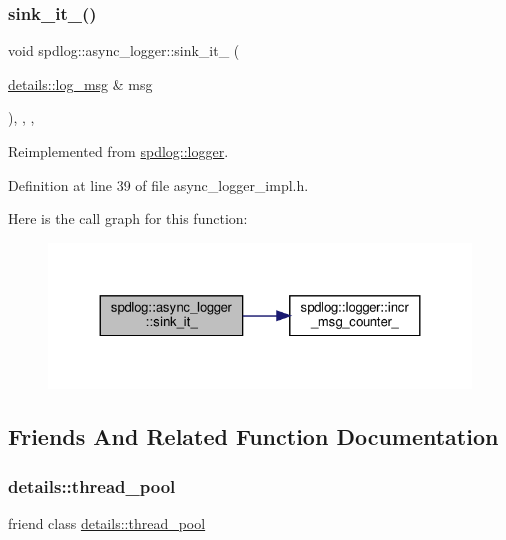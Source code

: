 \subsubsection{\texorpdfstring{sink\+\_\+it\+\_\+()}{sink\_it\_()}}
{\footnotesize\ttfamily void spdlog\+::async\+\_\+logger\+::sink\+\_\+it\+\_\+ (\begin{DoxyParamCaption}\item[{\hyperlink{structspdlog_1_1details_1_1log__msg}{details\+::log\+\_\+msg} \&}]{msg }\end{DoxyParamCaption})\hspace{0.3cm}{\ttfamily [inline]}, {\ttfamily [override]}, {\ttfamily [protected]}, {\ttfamily [virtual]}}



Reimplemented from \hyperlink{classspdlog_1_1logger_a43ac8d73671a109cba253eadb0b049e2}{spdlog\+::logger}.



Definition at line 39 of file async\+\_\+logger\+\_\+impl.\+h.

Here is the call graph for this function\+:
\nopagebreak
\begin{figure}[H]
\begin{center}
\leavevmode
\includegraphics[width=324pt]{classspdlog_1_1async__logger_aefd367c3266773bfe756d34150705329_cgraph}
\end{center}
\end{figure}


\subsection{Friends And Related Function Documentation}
\mbox{\label{classspdlog_1_1async__logger_a67ce2a7de422d11203d66f1f6da4be03}} 
\subsubsection{\texorpdfstring{details\+::thread\+\_\+pool}{details::thread\_pool}}
{\footnotesize\ttfamily friend class \hyperlink{classspdlog_1_1details_1_1thread__pool}{details\+::thread\+\_\+pool}\hspace{0.3cm}{\ttfamily [friend]}}




